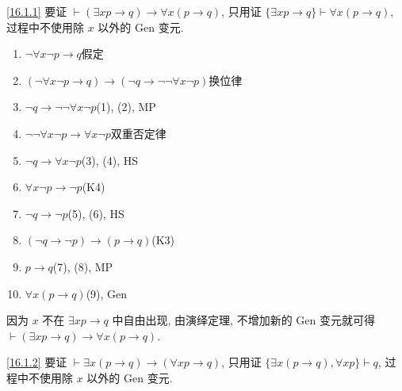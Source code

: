 \documentclass[boxes]{homework}
\begin{document}
\begin{solution}
    \ref{16.1.1} 要证 $\vdash (\exists xp\to q)\to \forall x(p\to q)$, 只用证 $\{\exists xp\to q\}\vdash \forall x(p\to q)$, 过程中不使用除 $x$ 以外的 Gen 变元.
    \begin{enumerate}[label = (\arabic*), parsep = 0pt, itemsep = 0pt, topsep = .25em]
        \item $\lnot \forall x \lnot p \to q$\hfill 假定
        \item $(\lnot \forall x \lnot p \to q)\to (\lnot q\to \lnot\lnot \forall x \lnot p)$\hfill 换位律
        \item $\lnot q\to \lnot\lnot \forall x \lnot p$\hfill (1), (2), MP
        \item $\lnot\lnot \forall x\lnot p\to \forall x\lnot p$\hfill 双重否定律
        \item $\lnot q\to \forall x\lnot p$\hfill (3), (4), HS
        \item $\forall x\lnot p\to \lnot p$\hfill (K4)
        \item $\lnot q\to \lnot p$\hfill (5), (6), HS
        \item $(\lnot q\to \lnot p)\to (p\to q)$\hfill (K3)
        \item $p\to q$\hfill (7), (8), MP
        \item $\forall x(p\to q)$\hfill (9), Gen
    \end{enumerate}
    因为 $x$ 不在 $\exists xp\to q$ 中自由出现, 由演绎定理, 不增加新的 Gen 变元就可得 $\vdash (\exists xp\to q)\to \forall x(p\to q)$.

    \ref{16.1.2} 要证 $\vdash \exists x(p\to q)\to (\forall xp\to q)$, 只用证 $\{\exists x(p\to q), \forall xp\}\vdash q$, 过程中不使用除 $x$ 以外的 Gen 变元.
    

\end{solution}
\end{document}
